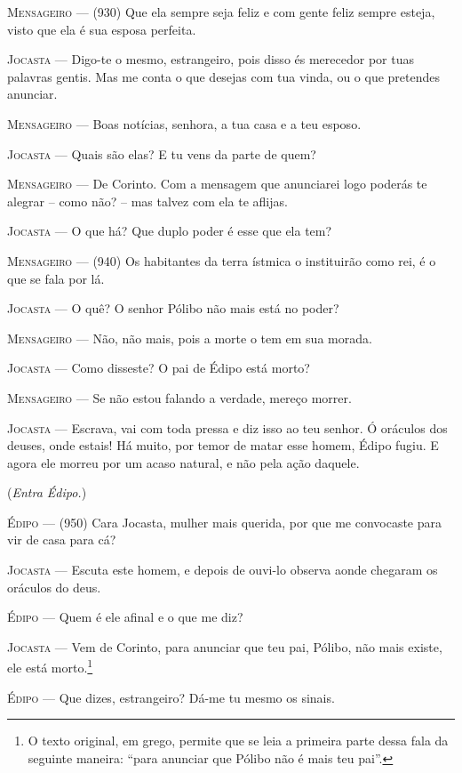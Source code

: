 \textsc{Mensageiro} --- (930) Que ela sempre seja feliz e com gente feliz sempre esteja, visto
que ela é sua esposa perfeita.

\textsc{Jocasta} --- Digo-te o mesmo, estrangeiro, pois disso és merecedor por tuas palavras
gentis. Mas me conta o que desejas com tua vinda, ou o que pretendes
anunciar.

\textsc{Mensageiro} --- Boas notícias, senhora, a tua casa e a teu esposo.

\textsc{Jocasta} --- Quais são elas? E tu vens da parte de quem?

\textsc{Mensageiro} --- De Corinto. Com a mensagem que anunciarei logo poderás te alegrar --
como não? -- mas talvez com ela te aflijas.

\textsc{Jocasta} --- O que há? Que duplo poder é esse que ela tem?

\textsc{Mensageiro} --- (940) Os habitantes da terra ístmica o instituirão como rei, é o que se
fala por lá.

\textsc{Jocasta} --- O quê? O senhor Pólibo não mais está no poder?

\textsc{Mensageiro} --- Não, não mais, pois a morte o tem em sua morada.

\textsc{Jocasta} --- Como disseste? O pai de Édipo está morto?

\textsc{Mensageiro} --- Se não estou falando a verdade, mereço morrer.

\textsc{Jocasta} --- Escrava, vai com toda pressa e diz isso ao teu senhor. Ó oráculos dos
deuses, onde estais! Há muito, por temor de matar esse homem, Édipo
fugiu. E agora ele morreu por um acaso natural, e não pela ação daquele.

(\emph{Entra Édipo.})

\textsc{Édipo} --- (950) Cara Jocasta, mulher mais querida, por que me convocaste para vir
de casa para cá?

\textsc{Jocasta} --- Escuta este homem, e depois de ouvi-lo observa aonde chegaram os
oráculos do deus.

\textsc{Édipo} --- Quem é ele afinal e o que me diz?

\textsc{Jocasta} --- Vem de Corinto, para anunciar que teu pai, Pólibo, não mais existe, ele
está morto.\footnote{O texto original, em grego, permite que se leia a
  primeira parte dessa fala da seguinte maneira: ``para anunciar
  que Pólibo não é mais teu pai''.}

\textsc{Édipo} --- Que dizes, estrangeiro? Dá-me tu mesmo os sinais.

